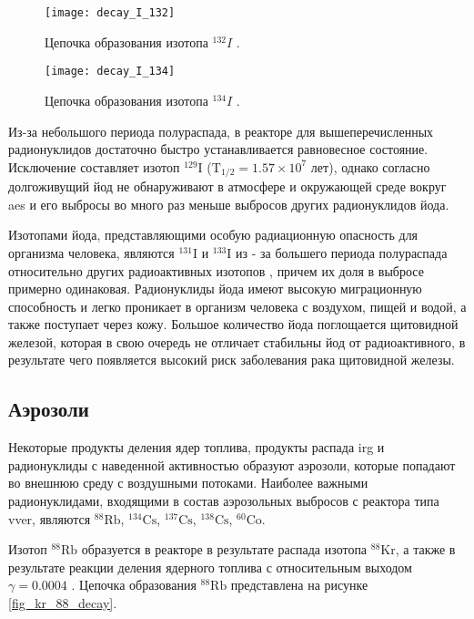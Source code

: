 \begin{figure}[ht!]
    \centering
    \texttt{[image: decay\_I\_132]}
    \captionsetup{justification=centering}
    \caption{Цепочка образования изотопа $^{132}I$ \cite{periodic_table}.}
    \label{fig_I_132_decay}
\end{figure}

\begin{figure}[ht!]
    \centering
    \texttt{[image: decay\_I\_134]}
    \captionsetup{justification=centering}
    \caption{Цепочка образования изотопа $^{134}I$ \cite{periodic_table}.}
    \label{fig_I_134_decay}
\end{figure}

Из-за небольшого периода полураспада, в реакторе для вышеперечисленных радионуклидов достаточно быстро устанавливается 
равновесное состояние. Исключение составляет изотоп $^{129}\text{I}$ ($\text{T}_{1/2} = 1.57 \times  10^7$ лет), однако 
согласно \cite{bekman_nuclear} долгоживущий йод не обнаруживают в атмосфере и окружающей среде вокруг \ac{aes} и его 
выбросы во много раз меньше выбросов других радионуклидов йода.

Изотопами йода, представляющими особую радиационную опасность для организма человека, являются $^{131}\text{I}$ и 
$^{133}\text{I}$ из - за большего периода полураспада относительно других радиоактивных изотопов \cite{nuc_waste}, 
причем их доля в выбросе примерно одинаковая. Радионуклиды йода имеют высокую миграционную способность и легко проникает 
в организм человека с воздухом, пищей и водой, а также поступает через кожу. Большое количество йода поглощается 
щитовидной железой, которая в свою очередь не отличает стабильны йод от радиоактивного, в результате чего появляется 
высокий риск заболевания рака щитовидной железы.

\subsection{Аэрозоли}

Некоторые продукты деления ядер топлива, продукты распада \ac{irg} и радионуклиды с наведенной активностью образуют 
аэрозоли, которые попадают во внешнюю среду с воздушными потоками. Наиболее важными радионуклидами, входящими в 
состав аэрозольных выбросов с реактора типа \ac{vver}, являются $^{88}\text{Rb}$, $^{134}\text{Cs}$, $^{137}\text{Cs}$, 
$^{138}\text{Cs}$, $^{60}\text{Co}$. 

Изотоп $^{88}\text{Rb}$ образуется в реакторе в результате распада изотопа $^{88}\text{Kr}$, а также в результате 
реакции деления ядерного топлива с относительным выходом $\gamma=0.0004$ \cite{gusev_bio}. Цепочка образования 
$^{88}\text{Rb}$ представлена на рисунке \ref{fig_kr_88_decay}.

